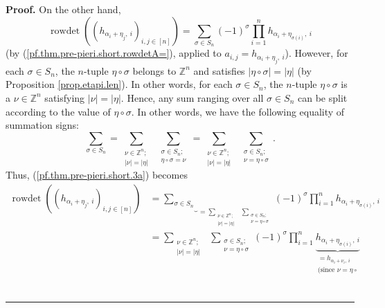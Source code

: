 \documentclass[numbers=enddot,12pt,final,onecolumn,notitlepage,english]{scrartcl}%
\theoremstyle{definition}
\newenvironment{proof}[1][Proof]{\noindent\textbf{#1.} }{\ \rule{0.5em}{0.5em}}
\let\sumnonlimits\sum
\let\prodnonlimits\prod
\renewcommand{\sum}{\sumnonlimits\limits}
\renewcommand{\prod}{\prodnonlimits\limits}
\newenvironment{vershort}{}{}
\begin{document}
\begin{vershort}
\begin{proof}
On the other hand,%
\begin{equation}
\operatorname*{rowdet}\left(  \left(  h_{\alpha_{i}+\eta_{j},\ i}\right)
_{i,j\in\left[  n\right]  }\right)  =\sum_{\sigma\in S_{n}}\left(  -1\right)
^{\sigma}\prod_{i=1}^{n}h_{\alpha_{i}+\eta_{\sigma\left(  i\right)  },\ i}
\label{pf.thm.pre-pieri.short.3a}%
\end{equation}
(by (\ref{pf.thm.pre-pieri.short.rowdetA=}), applied to $a_{i,j}=h_{\alpha
_{i}+\eta_{j},\ i}$). However, for each $\sigma\in S_{n}$, the $n$-tuple
$\eta\circ\sigma$ belongs to $\mathbb{Z}^{n}$ and satisfies $\left\vert
\eta\circ\sigma\right\vert =\left\vert \eta\right\vert $ (by Proposition
\ref{prop.etapi.len}). In other words, for each $\sigma\in S_{n}$, the
$n$-tuple $\eta\circ\sigma$ is a $\nu\in\mathbb{Z}^{n}$ satisfying $\left\vert
\nu\right\vert =\left\vert \eta\right\vert $. Hence, any sum ranging over all
$\sigma\in S_{n}$ can be split according to the value of $\eta\circ\sigma$. In
other words, we have the following equality of summation signs:%
\[
\sum_{\sigma\in S_{n}}=\sum_{\substack{\nu\in\mathbb{Z}^{n};\\\left\vert
\nu\right\vert =\left\vert \eta\right\vert }}\ \ \sum_{\substack{\sigma\in
S_{n};\\\eta\circ\sigma=\nu}}=\sum_{\substack{\nu\in\mathbb{Z}^{n}%
;\\\left\vert \nu\right\vert =\left\vert \eta\right\vert }}\ \ \sum
_{\substack{\sigma\in S_{n};\\\nu=\eta\circ\sigma}}.
\]
Thus, (\ref{pf.thm.pre-pieri.short.3a}) becomes%
\begin{align*}
\operatorname*{rowdet}\left(  \left(  h_{\alpha_{i}+\eta_{j},\ i}\right)
_{i,j\in\left[  n\right]  }\right)   &  =\underbrace{\sum_{\sigma\in S_{n}}%
}_{=\sum_{\substack{\nu\in\mathbb{Z}^{n};\\\left\vert \nu\right\vert
=\left\vert \eta\right\vert }}\ \ \sum_{\substack{\sigma\in S_{n};\\\nu
=\eta\circ\sigma}}}\left(  -1\right)  ^{\sigma}\prod_{i=1}^{n}h_{\alpha
_{i}+\eta_{\sigma\left(  i\right)  },\ i}\\
&  =\sum_{\substack{\nu\in\mathbb{Z}^{n};\\\left\vert \nu\right\vert
=\left\vert \eta\right\vert }}\ \ \sum_{\substack{\sigma\in S_{n};\\\nu
=\eta\circ\sigma}}\left(  -1\right)  ^{\sigma}\prod_{i=1}^{n}%
\underbrace{h_{\alpha_{i}+\eta_{\sigma\left(  i\right)  },\ i}}%
_{\substack{=h_{\alpha_{i}+\nu_{i},\ i}\\\text{(since }\nu=\eta\circ
}}
\end{align*}
\end{proof}
\end{vershort}
\end{document}
